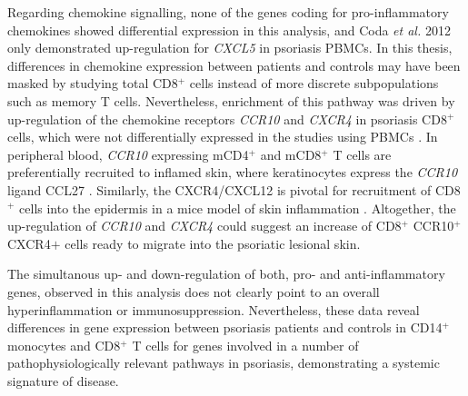 Regarding chemokine signalling, none of the genes coding for pro-inflammatory chemokines showed differential expression in this analysis, and Coda \textit{et al.} 2012 only demonstrated up-regulation for \textit{CXCL5} in psoriasis PBMCs. In this thesis, differences in chemokine expression between patients and controls may have been masked by studying total CD8$^+$ cells instead of more discrete subpopulations such as memory T cells. Nevertheless, enrichment of this pathway was driven by up-regulation of the chemokine receptors \textit{CCR10} and \textit{CXCR4} in psoriasis CD8$^+$ cells, which were not differentially expressed in the studies using PBMCs \parencite{Coda2012,Lee2009,Mesko2010}. In peripheral blood, \textit{CCR10} expressing mCD4$^+$ and mCD8$^+$ T cells are preferentially recruited to inflamed skin, where keratinocytes express the \textit{CCR10} ligand CCL27 \parencite{Hudak2002,Homey2002}. Similarly, the CXCR4/CXCL12 is pivotal for recruitment of CD8$^+$ cells into the epidermis in a mice model of skin inflammation \parencite{Zgraggen2014}. Altogether, the up-regulation of \textit{CCR10} and \textit{CXCR4} could suggest an increase of CD8$^+$ CCR10$^+$ CXCR4$+$ cells ready to migrate into the psoriatic lesional skin. 

The simultanous up- and down-regulation of both, pro- and anti-inflammatory genes, observed in this analysis does not clearly point to an overall hyperinflammation or immunosuppression. Nevertheless, these data reveal differences in gene expression between psoriasis patients and controls in CD14$^+$ monocytes and CD8$^+$ T cells for genes involved in a number of pathophysiologically relevant pathways in psoriasis, demonstrating a systemic signature of disease.



